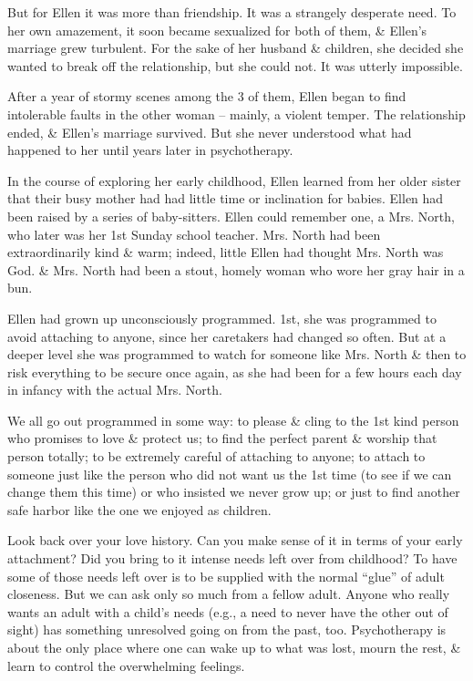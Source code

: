 \documentclass{article}
\numberwithin{equation}{section}
\begin{document}
But for Ellen it was more than friendship. It was a strangely desperate need. To her own amazement, it soon became sexualized for both of them, \& Ellen's marriage grew turbulent. For the sake of her husband \& children, she decided she wanted to break off the relationship, but she could not. It was utterly impossible.

After a year of stormy scenes among the 3 of them, Ellen began to find intolerable faults in the other woman -- mainly, a violent temper. The relationship ended, \& Ellen's marriage survived. But she never understood what had happened to her until years later in psychotherapy.

In the course of exploring her early childhood, Ellen learned from her older sister that their busy mother had had little time or inclination for babies. Ellen had been raised by a series of baby-sitters. Ellen could remember one, a Mrs. North, who later was her 1st Sunday school teacher. Mrs. North had been extraordinarily kind \& warm; indeed, little Ellen had thought Mrs. North was God. \& Mrs. North had been a stout, homely woman who wore her gray hair in a bun.

Ellen had grown up unconsciously programmed. 1st, she was programmed to avoid attaching to anyone, since her caretakers had changed so often. But at a deeper level she was programmed to watch for someone like Mrs. North \& then to risk everything to be secure once again, as she had been for a few hours each day in infancy with the actual Mrs. North.

We all go out programmed in some way: to please \& cling to the 1st kind person who promises to love \& protect us; to find the perfect parent \& worship that person totally; to be extremely careful of attaching to anyone; to attach to someone just like the person who did not want us the 1st time (to see if we can change them this time) or who insisted we never grow up; or just to find another safe harbor like the one we enjoyed as children.

Look back over your love history. Can you make sense of it in terms of your early attachment? Did you bring to it intense needs left over from childhood? To have some of those needs left over is to be supplied with the normal ``glue'' of adult closeness. But we can ask only so much from a fellow adult. Anyone who really wants an adult with a child's needs (e.g., a need to never have the other out of sight) has something unresolved going on from the past, too. Psychotherapy is about the only place where one can wake up to what was lost, mourn the rest, \& learn to control the overwhelming feelings.
\end{document}
